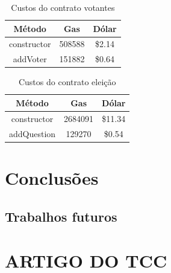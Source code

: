 \documentclass{ufsctex/ufsctex}
\begin{document}
\begin{table}[]
	\centering
	\begin{tabular}{||c|c|c||}
		\hline
		\textbf{Método}  & \textbf{Gas} & \textbf{Dólar}  \\ [0.2ex] \hline \hline
		constructor & 508588 & \$2.14 \\ 
		addVoter    & 151882 & \$0.64 \\ \hline
	\end{tabular}
	\caption{Custos do contrato votantes}
	\label{tab:my-table}
\end{table}

\begin{table}[]
	\centering
	\begin{tabular}{||c|c|c||}
		\hline
		\textbf{Método} & \textbf{Gas}  & \textbf{Dólar}   \\ [0.2ex] \hline \hline
		constructor & 2684091 & \$11.34 \\ 
		addQuestion & 129270  & \$0.54  \\ \hline
	\end{tabular}
	\caption{Custos do contrato eleição}
	\label{tab:my-table}
\end{table}

\chapter{Conclusões}

\section{Trabalhos futuros}





\apendice{}

\chapter{ARTIGO DO TCC}
\end{document}
